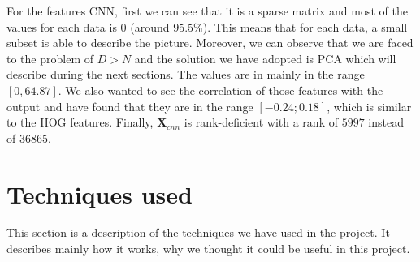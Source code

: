 \documentclass{article} %
\begin{document}
For the features CNN, first we can see that it is a sparse matrix and most of the values for each data is $0$ (around $95.5\%$). This means that for each data, a small subset is able to describe the picture. Moreover, we can observe that we are faced to the problem of $D > N$ and the solution we have adopted is PCA which will describe during the next sections. The values are in mainly in the range $[0, 64.87]$. We also wanted to see the correlation of those features with the output and have found that they are in the range $[-0.24;0.18]$, which is similar to the HOG features. Finally,  $\mathbf{X}_{cnn}$ is rank-deficient with a rank of $5997$ instead of $36865$.

\section{Techniques used}

This section is a description of the techniques we have used in the project. It describes mainly how it works, why we thought it could be useful in this project.

\begin{figure}[!ht]
\center
{}
\hfill
{}
\hfill
\caption{}
\end{figure}
\end{document}
